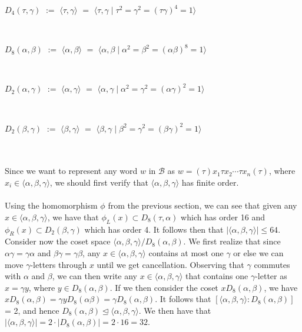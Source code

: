 \documentclass[11pt]{amsart}
\theoremstyle{definition}
\theoremstyle{remark}
\numberwithin{equation}{section}
\begin{document}
\centerline{$D_{4}(\tau, \gamma)$ $:=$ $\langle\tau, \gamma \rangle$ $=$ $\langle \tau, \gamma \mid \tau^{2} = \gamma^{2} = (\tau\gamma)^{4} = 1 \rangle$} \\ 
\centerline{$D_{8}(\alpha, \beta)$ $:=$ $\langle \alpha, \beta \rangle$ $=$ $\langle \alpha, \beta \mid \alpha^{2} = \beta^{2} = (\alpha \beta)^{8} = 1 \rangle$} \\ 
\centerline{$D_{2}(\alpha, \gamma)$ $:=$ $\langle \alpha, \gamma \rangle$ $=$ $\langle \alpha, \gamma \mid \alpha^{2} = \gamma^{2} = (\alpha \gamma)^{2} = 1 \rangle$} \\ 
\centerline{$D_{2}(\beta, \gamma)$ $:=$ $\langle \beta, \gamma \rangle$ $=$ $\langle \beta, \gamma \mid \beta^{2} = \gamma^{2} = (\beta \gamma)^{2} = 1 \rangle$} \\ \\
Since we want to represent any word $w$ in $\mathcal{B}$ as $w = (\tau) x_{1} \tau x_{2} \cdots \tau x_{n} (\tau) $, where $x_{i} \in \langle \alpha, \beta, \gamma \rangle$, we should first verify that $\langle \alpha, \beta, \gamma \rangle$ has finite order. \\ \\
Using the homomorphism $\phi$ from the previous section, we can see that given any $x \in \langle \alpha, \beta, \gamma \rangle$, we have that $\phi_{L}(x) \subset D_{8}(\tau, \alpha)$ which has order 16 and $\phi_{R}(x) \subset D_{2}(\beta, \gamma)$ which has order 4. It follows then that $ \left| \langle \alpha, \beta, \gamma \rangle \right| \leq 64$. Consider now the coset space $ \langle \alpha, \beta, \gamma \rangle  / D_{8} (\alpha, \beta )$. We first realize that since $\alpha \gamma = \gamma \alpha$ and $\beta \gamma = \gamma \beta$, any $x \in \langle \alpha, \beta, \gamma \rangle$ contains at most one $\gamma$ or else we can move $\gamma$-letters through $x$ until we get cancellation. Observing that $\gamma$ commutes with $\alpha$ and $\beta$, we can then write any $x \in \langle \alpha, \beta, \gamma \rangle$ that contains one $\gamma$-letter as $x = \gamma y$, where $y \in D_{8}(\alpha, \beta)$. If we then consider the coset $x D_{8}(\alpha, \beta)$, we have $x D_{8}(\alpha, \beta) = \gamma y D_{8} ( \alpha \beta ) = \gamma D_{8} (\alpha, \beta)$. It follows that $[ \langle \alpha, \beta, \gamma \rangle \colon D_{8}(\alpha, \beta) ]$ = 2, and hence $D_{8}(\alpha, \beta) \unlhd \langle \alpha, \beta, \gamma \rangle$. We then have that $|\langle \alpha, \beta, \gamma \rangle| = 2 \cdot |D_{8}(\alpha, \beta)| = 2 \cdot 16 = 32$. \\ \\
\end{document}
